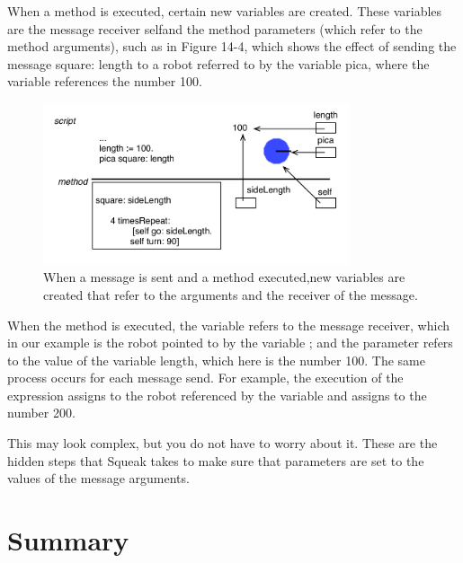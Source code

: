\documentclass[a4paper,10pt,twoside]{book}
\begin{document}
When a method is executed, certain new variables are created. These variables are the 
message receiver selfand the method parameters (which refer to the method arguments), 
such as  in Figure 14-4, which shows the effect of sending the message square: 
length to a robot referred to by the variable pica, where the variable  references the 
number 100.

\begin{figure}
	\begin{center}
\includegraphics[width=9cm]{argumentBoxes}
\caption{When a message is sent and a method executed,new variables are created that refer 
to the arguments and the receiver of the message.  \label{fig:14-4}}
\end{center}
\end{figure}






When the method  is executed, the variable \self refers to the message receiver, 
which in our example is the robot pointed to by the variable ; and the parameter  
refers to the value of the variable length, which here is the number 100. The same process occurs 
for each message send. For example, the execution of the expression  assigns 
to \self the robot referenced by the variable  and assigns to  the number 200. 








This may look complex, but you do not have to worry about it. These are the hidden steps 
that Squeak takes to make sure that parameters are set to the values of the message arguments. 



\section{Summary} 
\end{document}
